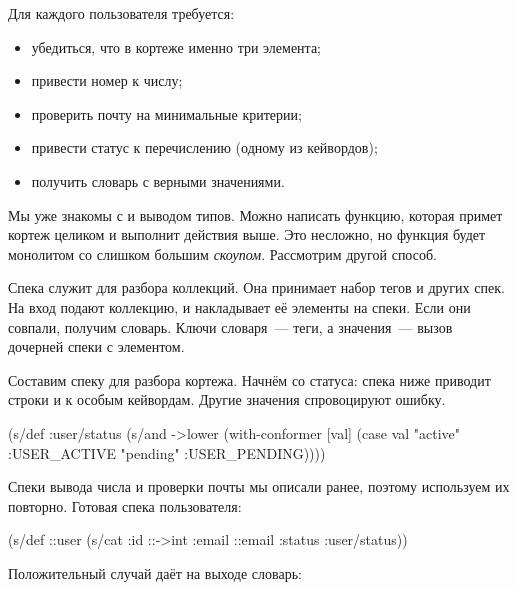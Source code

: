 Для каждого пользователя требуется:

\begin{itemize}

\item
  убедиться, что в кортеже именно три элемента;

\item
  привести номер к числу;

\item
  проверить почту на минимальные критерии;

\item
  привести статус к перечислению (одному из кейвордов);

\item
  получить словарь с верными значениями.

\end{itemize}

Мы уже знакомы с  и выводом типов. Можно написать функцию,
которая примет кортеж целиком и выполнит действия выше. Это несложно, но функция
будет монолитом со слишком большим \emph{скоупом}. Рассмотрим другой способ.


Спека  служит для разбора коллекций. Она принимает набор тегов и
других спек. На вход подают коллекцию, и  накладывает её элементы на
спеки. Если они совпали, получим словарь. Ключи словаря~--- теги, а значения~---
вызов дочерней спеки с элементом.

Составим спеку для разбора кортежа. Начнём со статуса: спека ниже приводит
строки  и  к особым кейвордам. Другие значения
спровоцируют ошибку.

\begin{clojure}
(s/def :user/status
  (s/and ->lower
         (with-conformer [val]
           (case val
             "active"  :USER_ACTIVE
             "pending" :USER_PENDING))))
\end{clojure}

Спеки вывода числа  и проверки почты  мы описали
ранее, поэтому используем их повторно. Готовая спека пользователя:

\begin{clojure}
(s/def ::user
  (s/cat :id ::->int
         :email ::email
         :status :user/status))
\end{clojure}

\noindent
Положительный случай даёт на выходе словарь:

